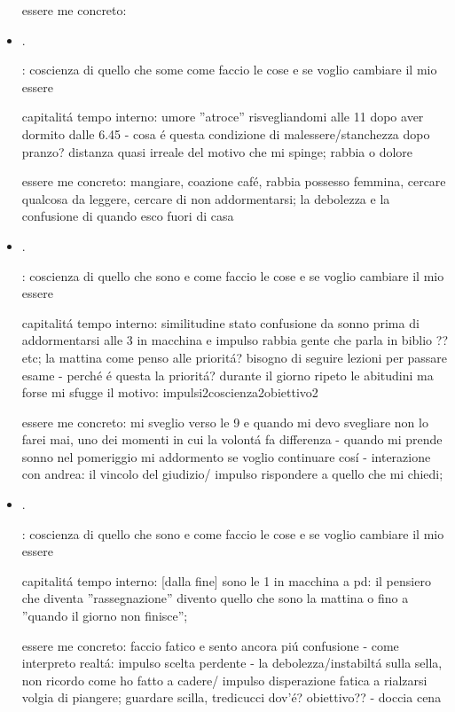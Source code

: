 \begin{itemize}
essere me concreto:

\item {}.

: coscienza di quello che some come faccio le cose e se voglio cambiare il mio essere

capitalit\'a tempo interno: umore ''atroce'' risvegliandomi alle 11 dopo aver dormito dalle 6.45 - cosa \'e questa condizione di malessere/stanchezza dopo pranzo? distanza quasi irreale del motivo che mi spinge; rabbia o dolore

essere me concreto: mangiare, coazione caf\'e, rabbia possesso femmina, cercare qualcosa da leggere, cercare di non addormentarsi; la debolezza e la confusione di quando esco fuori di casa

\item {}.

: coscienza di quello che sono e come faccio le cose e se voglio cambiare il mio essere

capitalit\'a tempo interno: similitudine stato confusione da sonno prima di addormentarsi alle 3 in macchina e impulso rabbia gente che parla in biblio ?? etc; la mattina come penso alle priorit\'a? bisogno di seguire lezioni per passare esame - perch\'e \'e questa la priorit\'a? durante il giorno ripeto le abitudini ma forse mi sfugge il motivo: impulsi2coscienza2obiettivo2

essere me concreto: mi sveglio verso le 9 e quando mi devo svegliare non lo farei mai, uno dei momenti in cui la volont\'a fa differenza - quando mi prende sonno nel pomeriggio mi addormento se voglio continuare cos\'i - interazione con andrea: il vincolo del giudizio/ impulso rispondere a quello che mi chiedi;

\item {}.

: coscienza di quello che sono e come faccio le cose e se voglio cambiare il mio essere

capitalit\'a tempo interno: [dalla fine] sono le 1 in macchina a pd: il pensiero che diventa ''rassegnazione'' divento quello che sono la mattina o fino a ''quando il giorno non finisce''; 

essere me concreto: faccio fatico e sento ancora pi\'u confusione - come interpreto realt\'a: impulso scelta perdente - la debolezza/instabilt\'a sulla sella, non ricordo come ho fatto a cadere/ impulso disperazione fatica a rialzarsi volgia di piangere; guardare scilla, tredicucci dov'\'e? obiettivo?? - doccia cena


\end{itemize}
